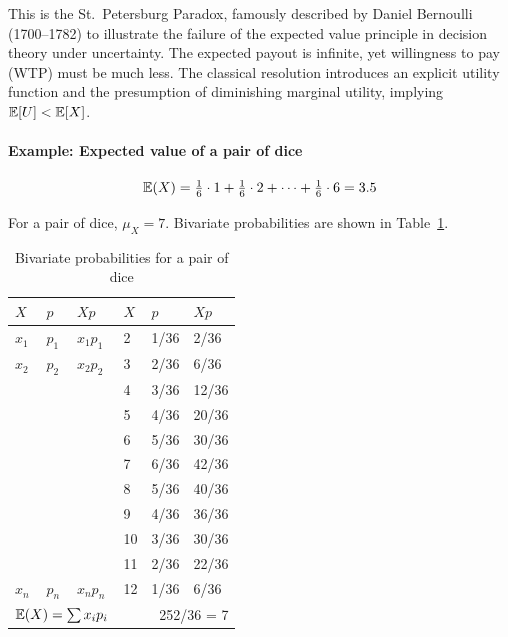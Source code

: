 This is the St.~Petersburg Paradox, famously described by Daniel
Bernoulli (1700--1782) to illustrate the failure of
the expected value principle in decision theory under uncertainty. The expected
payout is infinite, yet willingness to pay (WTP)
must be much less. The classical resolution introduces an explicit utility
function and the presumption of diminishing marginal utility, implying
$\mathbb{E}[U] < \mathbb{E}[X]$.

\paragraph{Example: Expected value of a pair of dice}

\begin{equation*}
  \mathbb{E}(X) = \tfrac{1}{6}\cdot1 + \tfrac{1}{6}\cdot2 + \cdots
          + \tfrac{1}{6}\cdot6 = 3.5
\end{equation*}

For a pair of dice, $\mu_X = 7$. Bivariate probabilities are shown in
Table~\ref{tbl_Dice}.

\begin{table}[htp]
\centering
\caption{Bivariate probabilities for a pair of dice}
\label{tbl_Dice}
\renewcommand{\arraystretch}{1.3}
\begin{tabular}{@{}lll|lll@{}}
\toprule
$X$ & $p$ & $Xp$ & $X$ & $p$ & $Xp$ \\
\midrule
$x_1$ & $p_1$ & $x_1p_1$ & 2  & 1/36 & 2/36  \\
$x_2$ & $p_2$ & $x_2p_2$ & 3  & 2/36 & 6/36  \\
      &       &           & 4  & 3/36 & 12/36 \\
      &       &           & 5  & 4/36 & 20/36 \\
      &       &           & 6  & 5/36 & 30/36 \\
      &       &           & 7  & 6/36 & 42/36 \\
      &       &           & 8  & 5/36 & 40/36 \\
      &       &           & 9  & 4/36 & 36/36 \\
      &       &           & 10 & 3/36 & 30/36 \\
      &       &           & 11 & 2/36 & 22/36 \\
$x_n$ & $p_n$ & $x_np_n$ & 12 & 1/36 & 6/36  \\
\midrule
\multicolumn{3}{l}{$\mathbb{E}(X)=\sum x_i p_i$} &&
\multicolumn{2}{r}{252/36 = 7} \\
\bottomrule
\end{tabular}
\renewcommand{\arraystretch}{1}
\end{table}

